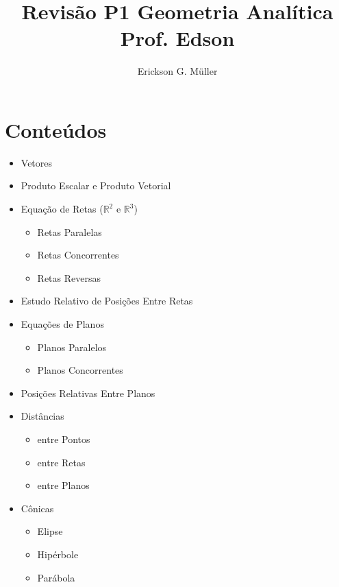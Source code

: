\documentclass[ ]{article}
\title{Revisão P1 Geometria Analítica\\Prof. Edson}
\author{Erickson G. Müller}
\begin{document}
	\maketitle
	\newpage
	
	\section*{Conteúdos}
		\begin{itemize}
			\item Vetores
			\item Produto Escalar e Produto Vetorial
			\item Equação de Retas ($\mathbb{R}^2$ e $\mathbb{R}^3$)
			\begin{itemize}
				\item Retas Paralelas
				\item Retas Concorrentes
				\item Retas Reversas
			\end{itemize}
			\item Estudo Relativo de Posições Entre Retas
			\item Equações de Planos
			\begin{itemize}
				\item Planos Paralelos
				\item Planos Concorrentes
			\end{itemize}
			\item Posições Relativas Entre Planos
			\item Distâncias
			\begin{itemize}
				\item entre Pontos
				\item entre Retas
				\item entre Planos
			\end{itemize}
			\item Cônicas
				\begin{itemize}
					\item Elipse
					\item Hipérbole
					\item Parábola
				\end{itemize}
		\end{itemize}
\end{document}
